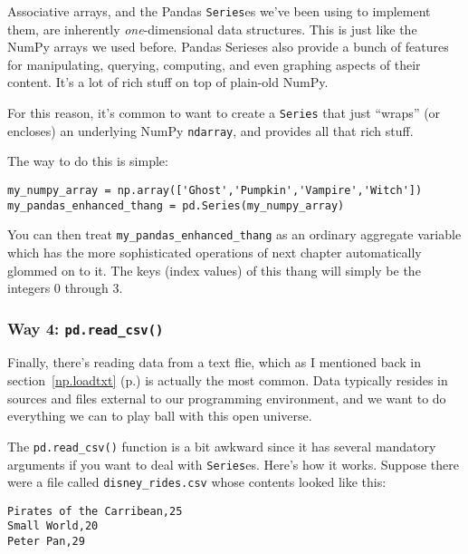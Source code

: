 \label{wrap}

Associative arrays, and the Pandas \texttt{Series}es we've been using to
implement them, are inherently \textit{one}-dimensional data structures. This
is just like the NumPy arrays we used before. Pandas Serieses also provide a
bunch of features for manipulating, querying, computing, and even graphing
aspects of their content. It's a lot of rich stuff on top of plain-old NumPy.


For this reason, it's common to want to create a \texttt{Series} that just
``wraps'' (or encloses) an underlying NumPy \texttt{ndarray}, and provides all
that rich stuff.

The way to do this is simple:

\begin{Verbatim}[fontsize=\small,samepage=true,frame=single,framesep=3mm]
my_numpy_array = np.array(['Ghost','Pumpkin','Vampire','Witch'])
my_pandas_enhanced_thang = pd.Series(my_numpy_array)
\end{Verbatim}

You can then treat \texttt{my\_pandas\_enhanced\_thang} as an ordinary
aggregate variable which has the more sophisticated operations of next chapter
automatically glommed on to it. The keys (index values) of this thang will
simply be the integers 0 through 3.

\subsubsection{Way 4: \texttt{pd.read\_csv()}}

Finally, there's reading data from a text flie, which as I mentioned back in
section~\ref{np.loadtxt} (p.\pageref{np.loadtxt}) is actually the most common. 
Data typically resides in sources and files external to our programming
environment, and we want to do everything we can to play ball with this open
universe.

The \texttt{pd.read\_csv()} function is a bit awkward since it has several
mandatory arguments if you want to deal with \texttt{Series}es. Here's how it
works. Suppose there were a file called \texttt{disney\_rides.csv} whose
contents looked like this:

\begin{Verbatim}[fontsize=\small,samepage=true,frame=single,framesep=3mm]
Pirates of the Carribean,25
Small World,20
Peter Pan,29
\end{Verbatim}

